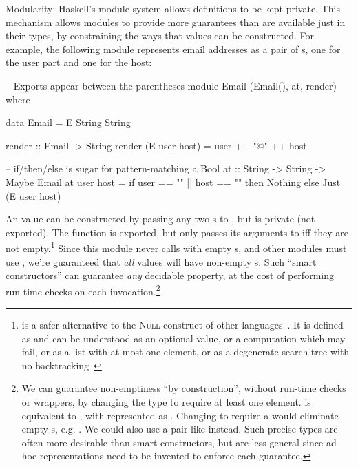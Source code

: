 \begin{description}
\item{Modularity}: Haskell's module system allows definitions to be kept
  private. This mechanism allows modules to provide more guarantees than are
  available just in their types, by constraining the ways that values can be
  constructed. For example, the following module represents email addresses as a
  pair of s, one for the user part and one for the host:

  \begin{haskell}
-- Exports appear between the parentheses
module Email (Email(), at, render) where

data Email = E String String

render :: Email -> String
render (E user host) = user ++ "@" ++ host

-- if/then/else is sugar for pattern-matching a Bool
at :: String -> String -> Maybe Email
at user host = if user == "" || host == ""
                  then Nothing
                  else Just (E user host)
  \end{haskell}

  An  value can be constructed by passing any two s to
  , but  is private (not exported). The  function is
  exported, but only passes its arguments to  iff they are not
  empty.\footnote{ is a safer alternative to the \textsc{Null}
    construct of other languages~\cite{hoare2009null}. It is defined as
     and can be understood as an optional
    value, or a computation which may fail, or as a list with at most one
    element, or as a degenerate search tree with no
    backtracking~\cite{wadler1985replace}} Since this module never calls 
  with empty s, and other modules must use , we're guaranteed
  that \emph{all}  values will have non-empty s. Such
  ``smart constructors'' can guarantee \emph{any} decidable property, at the
  cost of performing run-time checks on each invocation.\footnote{We can
    guarantee non-emptiness ``by construction'', without run-time checks or
     wrappers, by changing the type to require at least one element.
     is equivalent to , with  represented as
    . Changing  to require a  would eliminate empty
    s, e.g. . We
    could also use a pair like  instead.
    Such precise types are often more desirable than smart constructors, but are
    less general since ad-hoc representations need to be invented to enforce
    each guarantee.}

\end{description}

